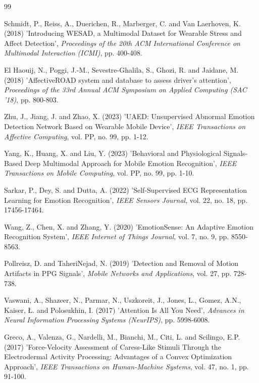 \documentclass[12pt, a4paper]{report}
\numberwithin{equation}{chapter}
\begin{document}
\clearpage
\renewcommand{\bibname}{References}
\singlespacing
\begin{thebibliography}{99}
\singlespacing

Schmidt, P., Reiss, A., Duerichen, R., Marberger, C. and Van Laerhoven, K. (2018) 'Introducing WESAD, a Multimodal Dataset for Wearable Stress and Affect Detection', \textit{Proceedings of the 20th ACM International Conference on Multimodal Interaction (ICMI)}, pp. 400-408.

El Haouij, N., Poggi, J.-M., Sevestre-Ghalila, S., Ghozi, R. and Jaidane, M. (2018) 'AffectiveROAD system and database to assess driver's attention', \textit{Proceedings of the 33rd Annual ACM Symposium on Applied Computing (SAC '18)}, pp. 800-803.

Zhu, J., Jiang, J. and Zhao, X. (2023) 'UAED: Unsupervised Abnormal Emotion Detection Network Based on Wearable Mobile Device', \textit{IEEE Transactions on Affective Computing}, vol. PP, no. 99, pp. 1-12.

Yang, K., Huang, X. and Liu, Y. (2023) 'Behavioral and Physiological Signals-Based Deep Multimodal Approach for Mobile Emotion Recognition', \textit{IEEE Transactions on Mobile Computing}, vol. PP, no. 99, pp. 1-10.

Sarkar, P., Dey, S. and Dutta, A. (2022) 'Self-Supervised ECG Representation Learning for Emotion Recognition', \textit{IEEE Sensors Journal}, vol. 22, no. 18, pp. 17456-17464.

Wang, Z., Chen, X. and Zhang, Y. (2020) 'EmotionSense: An Adaptive Emotion Recognition System', \textit{IEEE Internet of Things Journal}, vol. 7, no. 9, pp. 8550-8563.

Pollreisz, D. and TaheriNejad, N. (2019) 'Detection and Removal of Motion Artifacts in PPG Signals', \textit{Mobile Networks and Applications}, vol. 27, pp. 728-738.

Vaswani, A., Shazeer, N., Parmar, N., Uszkoreit, J., Jones, L., Gomez, A.N., Kaiser, Ł. and Polosukhin, I. (2017) 'Attention Is All You Need', \textit{Advances in Neural Information Processing Systems (NeurIPS)}, pp. 5998-6008.

Greco, A., Valenza, G., Nardelli, M., Bianchi, M., Citi, L. and Scilingo, E.P. (2017) 'Force-Velocity Assessment of Caress-Like Stimuli Through the Electrodermal Activity Processing: Advantages of a Convex Optimization Approach', \textit{IEEE Transactions on Human-Machine Systems}, vol. 47, no. 1, pp. 91-100.


\end{thebibliography}
\end{document}
